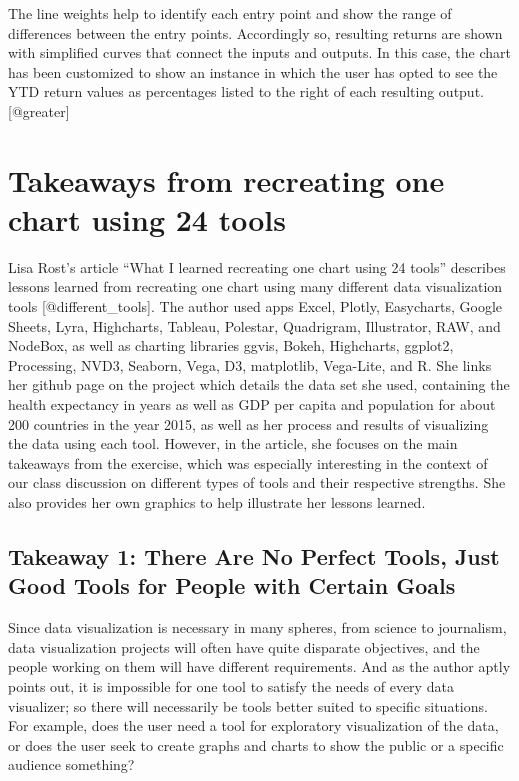 \documentclass[]{book}
\theoremstyle{definition}
\theoremstyle{definition}
\theoremstyle{definition}
\theoremstyle{remark}
\begin{document}
The line weights help to identify each entry point and show the range of
differences between the entry points. Accordingly so, resulting returns
are shown with simplified curves that connect the inputs and outputs. In
this case, the chart has been customized to show an instance in which
the user has opted to see the YTD return values as percentages listed to
the right of each resulting output.{[}@greater{]}

\section{Takeaways from recreating one chart using 24
tools}\label{takeaways-from-recreating-one-chart-using-24-tools}

Lisa Rost's article ``What I learned recreating one chart using 24
tools'' describes lessons learned from recreating one chart using many
different data visualization tools {[}@different\_tools{]}. The author
used apps Excel, Plotly, Easycharts, Google Sheets, Lyra, Highcharts,
Tableau, Polestar, Quadrigram, Illustrator, RAW, and NodeBox, as well as
charting libraries ggvis, Bokeh, Highcharts, ggplot2, Processing, NVD3,
Seaborn, Vega, D3, matplotlib, Vega-Lite, and R. She links her github
page on the project which details the data set she used, containing the
health expectancy in years as well as GDP per capita and population for
about 200 countries in the year 2015, as well as her process and results
of visualizing the data using each tool. However, in the article, she
focuses on the main takeaways from the exercise, which was especially
interesting in the context of our class discussion on different types of
tools and their respective strengths. She also provides her own graphics
to help illustrate her lessons learned.

\subsection{Takeaway 1: There Are No Perfect Tools, Just Good Tools for
People with Certain
Goals}\label{takeaway-1-there-are-no-perfect-tools-just-good-tools-for-people-with-certain-goals}

Since data visualization is necessary in many spheres, from science to
journalism, data visualization projects will often have quite disparate
objectives, and the people working on them will have different
requirements. And as the author aptly points out, it is impossible for
one tool to satisfy the needs of every data visualizer; so there will
necessarily be tools better suited to specific situations. For example,
does the user need a tool for exploratory visualization of the data, or
does the user seek to create graphs and charts to show the public or a
specific audience something?
\end{document}
